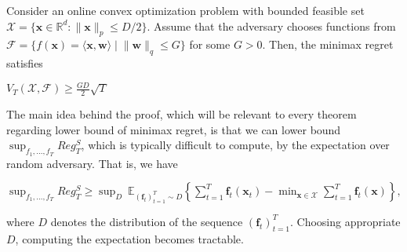 \documentclass[12pt, a4paper]{report}
\begin{document}
\begin{prop}\label{prop:cvx-minimax}
Consider an online convex optimization problem with bounded feasible set $\mathcal{X} = \{\mathbf{x} \in \mathbb{R}^d : \lVert \mathbf{x} \rVert_p \leq D/2 \}$. Assume that the adversary chooses functions from $\mathcal{F} = \{ f(\mathbf{x}) = \langle \mathbf{x}, \mathbf{w} \rangle \mid \lVert \mathbf{w} \rVert_q \leq G \}$ for some $G > 0$. Then, the minimax regret satisfies 
\begin{center}
    $V_T(\mathcal{X}, \mathcal{F}) \geq \frac{GD}{2}\sqrt{T}$
\end{center}
\end{prop}
The main idea behind the proof, which will be relevant to every theorem regarding lower bound of minimax regret, is that we can lower bound $\sup_{f_1, \dots, f_T} Reg_T^S$, which is typically difficult to compute, by the expectation over random adversary. That is, we have
\begin{center}
    $\displaystyle \sup_{f_1, \dots, f_T} Reg_T^S \geq \sup_{D}\ \mathbb{E}_{(\mathbf{f}_t)_{t=1}^T \sim D} \left\{ \sum_{t=1}^T \mathbf{f}_t(\mathbf{x}_t) - \min_{\mathbf{x} \in \mathcal{X}} \sum_{t=1}^T \mathbf{f}_t(\mathbf{x}) \right\},$ 
\end{center}
where $D$ denotes the distribution of the sequence $(\mathbf{f}_t)_{t=1}^T$. Choosing appropriate $D$, computing the expectation becomes tractable. 
\end{document}

